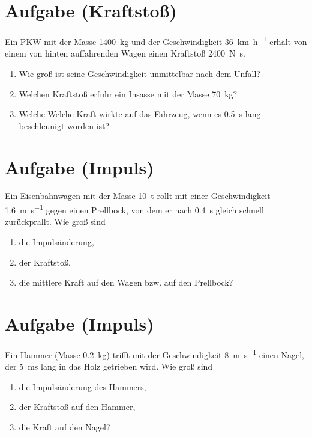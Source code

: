 \documentclass[12pt,oneside]{scrartcl}
\begin{document}
\section{Aufgabe (Kraftstoß)}
	Ein PKW mit der Masse \SI{1400}{\kilogram} und der Geschwindigkeit \SI{36}{\kilo\meter\per\hour} erhält von einem von hinten auffahrenden Wagen einen Kraftstoß \SI{2400}{\newton\second}.
	\begin{enumerate}
	\item Wie groß ist seine Geschwindigkeit unmittelbar nach dem Unfall?
	\item Welchen Kraftstoß erfuhr ein Insasse mit der Masse \SI{70}{\kilogram}?
	\item Welche Welche Kraft wirkte auf das Fahrzeug, wenn es \SI{0,5}{\second} lang beschleunigt worden ist?
	\end{enumerate}
	
\section{Aufgabe (Impuls)}
	Ein Eisenbahnwagen mit der Masse \SI{10}{\tonne} rollt mit einer Geschwindigkeit \SI{1,6}{\meter\per\second} gegen einen Prellbock, von dem er nach \SI{0,4}{\second} gleich schnell zurückprallt. Wie groß sind
	\begin{enumerate}
	\item die Impulsänderung,
	\item der Kraftstoß,
	\item die mittlere Kraft auf den Wagen bzw. auf den Prellbock?
	\end{enumerate}
	
\section{Aufgabe (Impuls)}
	Ein Hammer (Masse \SI{0,2}{\kilogram}) trifft mit der Geschwindigkeit \SI{8}{\meter\per\second} einen Nagel, der \SI{5}{\milli\second} lang in das Holz getrieben wird. Wie groß sind
	\begin{enumerate}
	\item die Impulsänderung des Hammers,
	\item der Kraftstoß auf den Hammer,
	\item die Kraft auf den Nagel?
	\end{enumerate}
		
\end{document}
